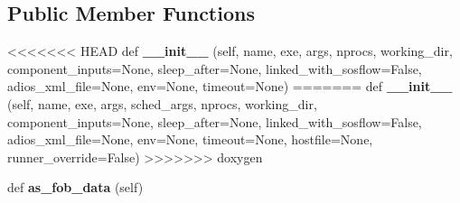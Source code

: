 \subsection*{Public Member Functions}
\begin{DoxyCompactItemize}
\item 
<<<<<<< HEAD
\mbox{\label{classcodar_1_1cheetah_1_1model_1_1_run_component_a905feca9714fa62e4cce6e740ecc411b}} 
def {\bfseries \+\_\+\+\_\+init\+\_\+\+\_\+} (self, name, exe, args, nprocs, working\+\_\+dir, component\+\_\+inputs=None, sleep\+\_\+after=None, linked\+\_\+with\+\_\+sosflow=False, adios\+\_\+xml\+\_\+file=None, env=None, timeout=None)
=======
\mbox{\label{classcodar_1_1cheetah_1_1model_1_1_run_component_a3fefe66c8e1f1f912a617e900ba6c75b}} 
def {\bfseries \+\_\+\+\_\+init\+\_\+\+\_\+} (self, name, exe, args, sched\+\_\+args, nprocs, working\+\_\+dir, component\+\_\+inputs=None, sleep\+\_\+after=None, linked\+\_\+with\+\_\+sosflow=False, adios\+\_\+xml\+\_\+file=None, env=None, timeout=None, hostfile=None, runner\+\_\+override=False)
>>>>>>> doxygen
\item 
\mbox{\label{classcodar_1_1cheetah_1_1model_1_1_run_component_a9400f073612f8afefa3568e0205b3770}} 
def {\bfseries as\+\_\+fob\+\_\+data} (self)
\end{DoxyCompactItemize}

